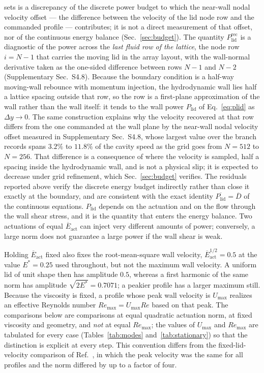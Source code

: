 \documentclass[11pt,a4paper]{article}
\newcommand{\Dbar}{\overline{D}}
\newcommand{\Plid}{P_{\mathrm{lid}}}
\begin{document}
sets is a discrepancy of the discrete power budget to which the near-wall nodal
velocity offset --- the difference between the velocity of the lid node row and the
commanded profile --- contributes; it is not a
direct measurement of that offset, nor of the continuous energy balance
(Sec.~\ref{sec:budget}). The quantity $\Plid^{\mathrm{rec}}$ is a diagnostic
of the power across the \emph{last fluid row of the lattice}, the node row
$i=N-1$ that carries the moving lid in the array layout, with the wall-normal
derivative taken as the one-sided difference between rows $N-1$ and $N-2$
(Supplementary Sec.~S4.8). Because the boundary condition is a half-way
moving-wall rebounce with momentum injection, the hydrodynamic wall lies half a lattice
spacing outside that row, so the row is a first-plane approximation of the wall
rather than the wall itself: it tends to the wall power $\Plid$ of
Eq.~\eqref{eq:plid} as $\Delta y\to0$. The same construction explains why the velocity
recovered at that row differs from the one commanded at the wall plane by the
near-wall nodal velocity offset measured in Supplementary Sec.~S4.8, whose largest
value over the branch records spans $3.2\%$ to $11.8\%$ of the cavity speed as the
grid goes from \(N=512\) to \(N=256\). That difference is a
consequence of where the velocity is sampled, half a spacing inside the
hydrodynamic wall, and is not a physical slip; it is expected to decrease under grid
refinement, which Sec.~\ref{sec:budget} verifies. The
residuals reported above verify the discrete energy budget indirectly
rather than close it exactly at the boundary, and are
consistent with the exact identity $\overline{\Plid}=\Dbar$ of the continuous
equations. $\Plid$ depends on the actuation
and on the flow through the wall shear stress, and it is the quantity that enters
the energy balance. Two actuations of equal $\overline{E}_{\mathrm{act}}$ can
inject very different amounts of power; conversely, a large norm does
not guarantee a large power if the wall shear is weak.

Holding $\overline{E}_{\mathrm{act}}$ fixed also fixes the root-mean-square wall
velocity, $\overline{E}_{\mathrm{act}}^{1/2}=0.5$ at the value $E^\ast=0.25$ used
throughout, but not the maximum wall velocity. A uniform lid of unit shape then
has amplitude $0.5$, whereas a first harmonic of the same norm has amplitude
$\sqrt{2E^\ast}=0.7071$; a peakier profile has a larger maximum still. Because
the viscosity is fixed, a profile whose peak wall velocity is $U_{\max}$ realizes
an effective Reynolds number $Re_{\max}=U_{\max}Re$ based on that peak. The
comparisons below are comparisons at equal quadratic actuation norm, at
fixed viscosity and geometry, and \emph{not} at equal $Re_{\max}$; the values of
$U_{\max}$ and $Re_{\max}$ are tabulated for every case
(Tables~\ref{tab:modes} and~\ref{tab:stationary}) so that the distinction is
explicit at every step. This convention differs from the fixed-lid-velocity
comparison of Ref.~\cite{beniaiche2026}, in which the peak velocity was the same
for all profiles and the norm differed by up to a factor of four.
\end{document}
